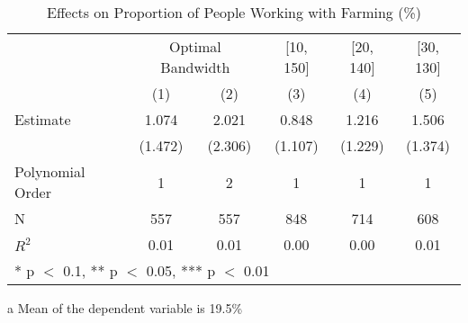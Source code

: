 \begin{table}[!h]

\caption{Effects on Proportion of People Working with Farming (\%) \label{tab:rdd_farming}}
\centering
\begin{threeparttable}
\begin{tabular}[t]{lccccc}
\toprule
\multicolumn{1}{c}{} & \multicolumn{2}{c}{Optimal Bandwidth} & \multicolumn{1}{c}{[10, 150]} & \multicolumn{1}{c}{[20, 140]} & \multicolumn{1}{c}{[30, 130]} \\
\cmidrule(l{3pt}r{3pt}){2-3} \cmidrule(l{3pt}r{3pt}){4-4} \cmidrule(l{3pt}r{3pt}){5-5} \cmidrule(l{3pt}r{3pt}){6-6}
  & (1) & (2) & (3) & (4) & (5)\\
\midrule
Estimate & \num{1.074} & \num{2.021} & \num{0.848} & \num{1.216} & \num{1.506}\\
 & (\num{1.472}) & (\num{2.306}) & (\num{1.107}) & (\num{1.229}) & (\num{1.374})\\

\midrule
Polynomial Order & 1 & 2 & 1 & 1 & 1\\
N & \num{557} & \num{557} & \num{848} & \num{714} & \num{608}\\
$R^2$ & \num{0.01} & \num{0.01} & \num{0.00} & \num{0.00} & \num{0.01}\\
\bottomrule
\multicolumn{6}{l}{\rule{0pt}{1em}* p $<$ 0.1, ** p $<$ 0.05, *** p $<$ 0.01}\\
\end{tabular}
\begin{tablenotes}
\item[a] Mean of the dependent variable is 19.5\%
\end{tablenotes}
\end{threeparttable}
\end{table}
